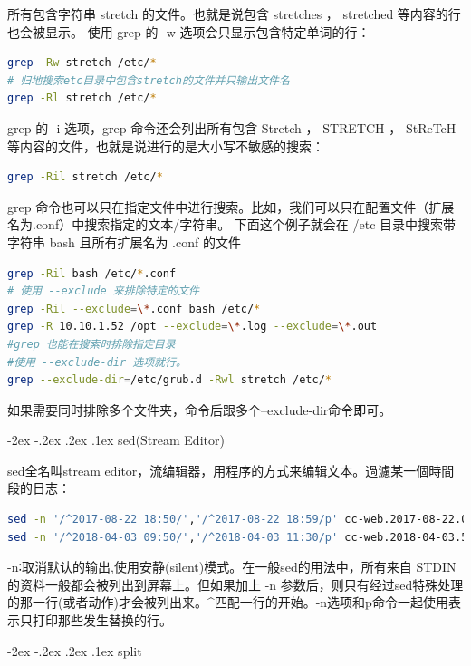 \documentclass[12pt]{book}
\makeatletter
\numberwithin{dummy}{section}
\theoremstyle{ocrenumbox}
\theoremstyle{blacknumex}
\theoremstyle{blacknumbox}
\theoremstyle{ocrenum}
\renewcommand\paragraph{\@startsection{paragraph}{4}{\z@}
	{-2ex \@plus-.2ex \@minus .2ex}
	{.1ex}
	{\normalfont\small\sffamily\bfseries}}
\makeatother
\begin{document}
所有包含字符串 stretch 的文件。也就是说包含 stretches ， stretched 等内容的行也会被显示。 使用 grep 的 -w 选项会只显示包含特定单词的行：

\begin{lstlisting}[language=Bash]
grep -Rw stretch /etc/*
# 归地搜索etc目录中包含stretch的文件并只输出文件名
grep -Rl stretch /etc/*
\end{lstlisting}

grep 的 -i 选项，grep 命令还会列出所有包含 Stretch ， STRETCH ， StReTcH 等内容的文件，也就是说进行的是大小写不敏感的搜索：

\begin{lstlisting}[language=Bash]
grep -Ril stretch /etc/*
\end{lstlisting}

grep 命令也可以只在指定文件中进行搜索。比如，我们可以只在配置文件（扩展名为.conf）中搜索指定的文本/字符串。 下面这个例子就会在 /etc 目录中搜索带字符串 bash 且所有扩展名为 .conf 的文件

\begin{lstlisting}[language=Bash]
grep -Ril bash /etc/*.conf
# 使用 --exclude 来排除特定的文件
grep -Ril --exclude=\*.conf bash /etc/*
grep -R 10.10.1.52 /opt --exclude=\*.log --exclude=\*.out
#grep 也能在搜索时排除指定目录
#使用 --exclude-dir 选项就行。
grep --exclude-dir=/etc/grub.d -Rwl stretch /etc/*
\end{lstlisting}

如果需要同时排除多个文件夹，命令后跟多个--exclude-dir命令即可。

\paragraph{sed(Stream Editor)}

sed全名叫stream editor，流编辑器，用程序的方式来编辑文本。過濾某一個時間段的日志：

\begin{lstlisting}[language=Bash]
sed -n '/^2017-08-22 18:50/','/^2017-08-22 18:59/p' cc-web.2017-08-22.0.log >> filter.log
sed -n '/^2018-04-03 09:50/','/^2018-04-03 11:30/p' cc-web.2018-04-03.5.log >> filter.log
\end{lstlisting}

-n∶取消默认的输出,使用安静(silent)模式。在一般sed的用法中，所有来自 STDIN的资料一般都会被列出到屏幕上。但如果加上 -n 参数后，则只有经过sed特殊处理的那一行(或者动作)才会被列出来。\^{}匹配一行的开始。-n选项和p命令一起使用表示只打印那些发生替换的行。


\paragraph{split}
\end{document}
